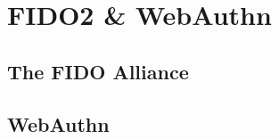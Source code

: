 
\section{FIDO2 \& WebAuthn}
\label{sec:results}

\subsection{The FIDO Alliance}
\label{subsec:fido_alliance}



\subsection{WebAuthn}
\label{subsec:webauthn}


